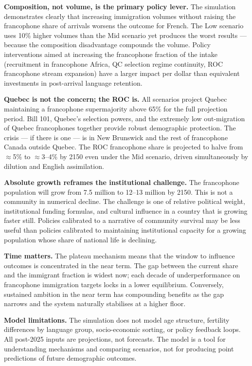 \documentclass[11pt,a4paper]{article}
\begin{document}
\bigskip

\textbf{Composition, not volume, is the primary policy lever.}
The simulation demonstrates clearly that increasing immigration volumes without
raising the francophone share of arrivals worsens the outcome for French.
The Low scenario uses 10\% higher volumes than the Mid scenario yet produces
the worst results --- because the composition disadvantage compounds the volume.
Policy interventions aimed at increasing the francophone fraction of the intake
(recruitment in francophone Africa, QC selection regime continuity, ROC
francophone stream expansion) have a larger impact per dollar than equivalent
investments in post-arrival language retention.

\textbf{Quebec is not the concern; the ROC is.}
All scenarios project Quebec maintaining a francophone supermajority above 65\%
for the full projection period.  Bill 101, Quebec's selection powers, and the
extremely low out-migration of Quebec francophones together provide robust
demographic protection.  The crisis --- if there is one --- is in New
Brunswick and the rest of francophone Canada outside Quebec.  The ROC
francophone share is projected to halve from $\approx$5\% to $\approx$3--4\%
by 2150 even under the Mid scenario, driven simultaneously by dilution and
English assimilation.

\textbf{Absolute growth reframes the institutional challenge.}
The francophone population will grow from 7.5 million to 12--13 million by
2150.  This is not a community in numerical decline.  The challenge is one of
relative political weight, institutional funding formulas, and cultural
influence in a country that is growing faster still.  Policies calibrated to a
narrative of community survival may be less useful than policies calibrated to
maintaining institutional capacity for a growing population whose share of
national life is declining.

\textbf{Time matters.}  The plateau mechanism means that the window to
influence outcomes is concentrated in the near term.  The gap between the
current share and the immigrant fraction is widest now; each decade of
underperformance on francophone immigration targets locks in a lower
equilibrium.  Conversely, sustained ambition in the near term has compounding
benefits as the gap narrows and the system naturally stabilises at a higher
floor.

\bigskip
\begin{tcolorbox}[statbox]
\textbf{Model limitations.}  The simulation does not model age structure,
fertility differences by language group, socio-economic sorting, or policy
feedback loops.  All post-2025 inputs are projections, not forecasts.  The
model is a tool for understanding mechanisms and comparing scenarios, not for
producing point predictions of future demographic outcomes.
\end{tcolorbox}
\end{document}
